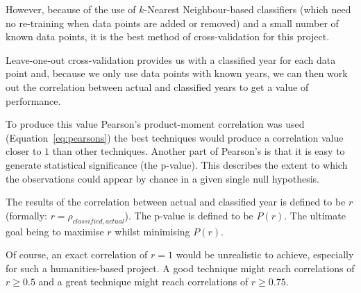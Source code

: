 However, because of the use of $k$-Nearest Neighbour-based classifiers (which need no re-training 
when data points are added or removed) and a small number of known data points, it is the best 
method of cross-validation for this project.

Leave-one-out cross-validation provides us with a classified year for each data point and, because
we only use data points with known years, we can then work out the correlation between actual and
classified years to get a value of performance.

To produce this value Pearson's product-moment correlation was used (Equation~\ref{eq:pearsons})
the best techniques would produce a correlation value closer to $1$ than other techniques. Another
part of Pearson's is that it is easy to generate statistical significance (the p-value). This
describes the extent to which the observations could appear by chance in a given single null
hypothesis.

The results of the correlation between actual and classified year is defined to be $r$ 
(formally: $r=\rho_{classified, actual}$). The p-value is defined to be $P(r)$. The ultimate goal 
being to maximise $r$ whilst minimising $P(r)$.

Of course, an exact correlation of $r=1$ would be unrealistic to achieve, especially for such a 
humanities-based project. A good technique might reach correlations of $r \ge 0.5$ and a great
technique might reach correlations of $r \ge 0.75$.



